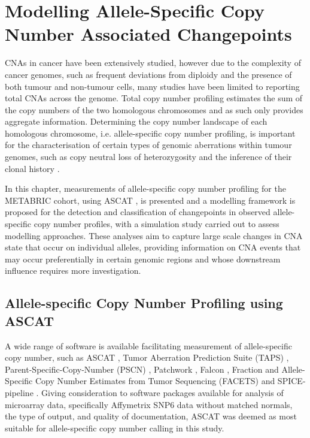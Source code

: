 
\section{Modelling Allele-Specific Copy Number Associated Changepoints}
CNAs in cancer have been extensively studied, however due to the complexity of cancer genomes, such as frequent deviations from diploidy and the presence of both tumour and non-tumour cells, many studies have been limited to reporting total CNAs across the genome. Total copy number profiling estimates the sum of the copy numbers of the two homologous chromosomes and as such only provides aggregate information. Determining the copy number landscape of each homologous chromosome, i.e. allele-specific copy number profiling, is important for the characterisation of certain types of genomic aberrations within tumour genomes, such as copy neutral loss of heterozygosity and the inference of their clonal history \citep{pmid20837533, pmid25477383}.  

In this chapter, measurements of allele-specific copy number profiling for the METABRIC cohort, using ASCAT \citep{pmid20837533}, is presented and a modelling framework is proposed for the detection and classification of changepoints in observed allele-specific copy number profiles, with a simulation study carried out to assess modelling approaches. These analyses aim to capture large scale changes in CNA state that occur on individual alleles, providing information on CNA events that may occur preferentially in certain genomic regions and whose downstream influence requires more investigation.  

\subsection{Allele-specific Copy Number Profiling using ASCAT}
A wide range of software is available facilitating measurement of allele-specific copy number, such as ASCAT \citep{pmid20837533}, Tumor Aberration Prediction Suite (TAPS) \citep{pmid22023820}, Parent-Specific-Copy-Number (PSCN) \citep{pmid21666266}, Patchwork \citep{pmid23531354}, Falcon \citep{pmid25477383}, Fraction and Allele-Specific Copy Number Estimates from Tumor Sequencing (FACETS) \citep{pmid27270079} and SPICE-pipeline \citep{CIANI2022183}. Giving consideration to software packages available for analysis of microarray data, specifically Affymetrix SNP6 data without matched normals, the type of output, and quality of documentation, ASCAT was deemed as most suitable for allele-specific copy number calling in this study. 

